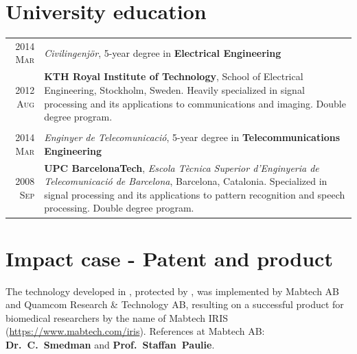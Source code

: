 \documentclass[a4paper,10pt]{article}
\begin{document}

  \section{University education}

    \begin{tabular}{r|p{13cm}}	
    
      \textsc{2014 Mar}  & \emph{Civilingenj\"{o}r}, 5-year degree in \textbf{Electrical Engineering} \\
      \textsc{2012 Aug}  & \footnotesize{\textbf{KTH Royal Institute of Technology}, School of Electrical Engineering, Stockholm, Sweden. 
			   Heavily specialized in signal processing and its applications to communications and imaging. Double degree program.} \\ 
      \multicolumn{2}{c}{} \\

      
      \textsc{2014 Mar}  & \emph{Enginyer de Telecomunicaci\'{o}}, 5-year degree in \textbf{Telecommunications Engineering} \\  
      \textsc{2008 Sep}  & \footnotesize{\textbf{UPC BarcelonaTech}, \emph{Escola T\`{e}cnica Superior
			   d'Enginyeria de Telecomunicaci\'{o} de Barcelona}, Barcelona, Catalonia. 
			   Specialized in signal processing and its applications to pattern recognition and speech processing. Double degree program.} \\
    \end{tabular}

  \begin{bibunit}
    \renewcommand\refname{Publications}
    \nocite{AguilaPla2019b,AguilaPla2019a,AguilaPla2019,AguilaPla2017,AguilaPla2017a,AguilaPla2018,AguilaPla2018a,AguilaPla2014}
    \footnotesize{
    }
   
    \section{Impact case - Patent and product}
        
        The technology developed in \cite{AguilaPla2017,AguilaPla2017a}, protected by \cite{Mabtech2017},
        was implemented by Mabtech AB and Quamcom Research \& Technology AB, resulting on a successful product
        for biomedical researchers by the name of Mabtech IRIS (\url{https://www.mabtech.com/iris}).
        References at Mabtech AB: \textbf{Dr.~C.~Smedman} and \textbf{Prof.~Staffan~Paulie}.
    
  \end{bibunit}
  
\end{document}
